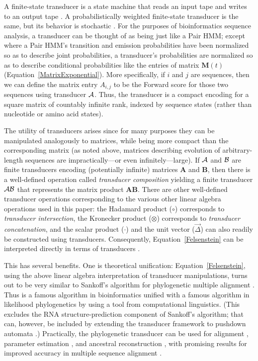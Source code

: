 \documentclass{bmcart}
\newcommand{\matr}[1]{\mathbf{#1}}
\newcommand{\trans}[1]{{\cal #1}}
\newcommand{\eqref}[1]{Equation~\ref{#1}}
\newcommand{\condmatrix}{\matr{M}}
\newcommand{\unitvec}{\vec{\Delta}}
\newcommand{\pointprod}{\circ}
\newcommand{\scalarprod}{\cdot}
\begin{document}
A finite-state transducer is a state machine that reads an input tape and writes to an output tape \cite{Mealy55}.
A probabilistically weighted finite-state transducer is the same, but its behavior is stochastic \cite{MohriPereiraRiley2000}.
For the purposes of bioinformatics sequence analysis,
a transducer can be thought of as being just like a Pair HMM;
except where a Pair HMM's transition and emission probabilities
have been normalized so as to describe joint probabilities,
a transducer's probabilities are normalized so as to describe conditional probabilities
like the entries of matrix $\condmatrix(t)$ (\eqref{MatrixExponential}).
More specifically, if $i$ and $j$ are sequences, then we can define the matrix entry $A_{i,j}$
to be the Forward score for those two sequences using transducer $\trans{A}$.
Thus, the transducer is a compact encoding for a square matrix of countably infinite rank,
indexed by sequence states (rather than nucleotide or amino acid states).

The utility of transducers arises since for many purposes they can be manipulated analogously to matrices,
while being more compact than the corresponding matrix (as noted above, matrices describing evolution of arbitrary-length sequences are impractically---or even infinitely---large).
If $\trans{A}$ and $\trans{B}$ are finite transducers encoding (potentially infinite) matrices $\matr{A}$ and $\matr{B}$,
then there is a well-defined operation called {\em transducer composition}
yielding a finite transducer $\trans{A}\trans{B}$ that represents the matrix product $\matr{A}\matr{B}$.
There are other well-defined transducer operations corresponding to the various other linear algebra
operations used in this paper:
the Hadamard product ($\pointprod$) corresponds to {\em transducer intersection},
the Kronecker product ($\otimes$) corresponds to {\em transducer concatenation},
and the scalar product ($\scalarprod$) and the unit vector ($\unitvec$) can also readily be constructed using transducers.
Consequently, \eqref{Felsenstein} can be interpreted directly
in terms of transducers \cite{WestessonEtAlArxiv2011,WestessonEtAl2012,BouchardCote2013}.

This has several benefits.
One is theoretical unification: \eqref{Felsenstein}, using the above
linear algebra interpretation of transducer manipulations,
turns out to be very similar to Sankoff's algorithm for phylogenetic multiple alignment \cite{Sankoff85}.
Thus is a famous algorithm in bioinformatics unified with a famous algorithm in likelihood phylogenetics
by using a tool from computational linguistics.
(This excludes the RNA structure-prediction component of Sankoff's algorithm;
that can, however, be included by extending the transducer
framework to pushdown automata \cite{BradleyHolmes2009}.)
Practically, the phylogenetic transducer can be used for alignment \cite{RedelingsSuchard2005,RedelingsSuchard2007},
parameter estimation \cite{Redelings2014}, and ancestral reconstruction \cite{WestessonEtAl2012},
with promising results for improved accuracy in multiple sequence alignment \cite{IndelHistorian}.
\end{document}
